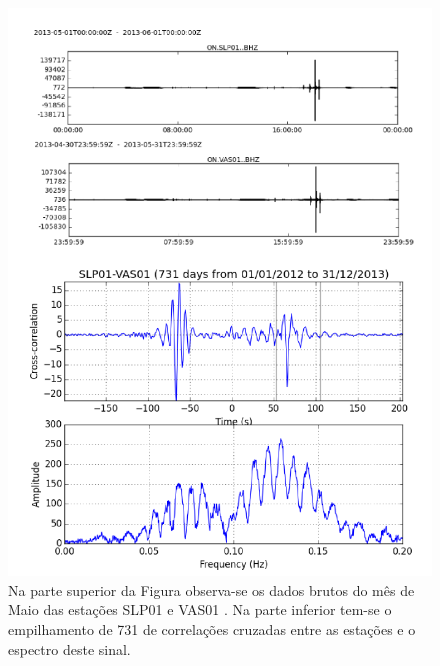 \begin{figure}[!ht]
\centering
\includegraphics[scale=0.5]{Figs/corr_dado_bruto.png}
\caption[Dados Brutos das estações SLP01 e VAS01 e a correlação dos mesmos.]{Na parte superior da Figura observa-se os dados brutos do mês de Maio das estações SLP01 e VAS01 . Na parte inferior tem-se o empilhamento de 731 de correlações cruzadas entre as estações e o espectro deste sinal.}
\label{corr_dado_bruto}
\end{figure}

